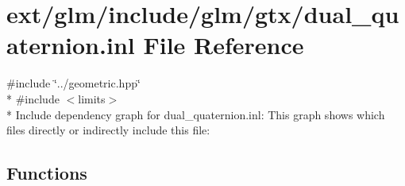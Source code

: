 \hypertarget{dual__quaternion_8inl}{\section{ext/glm/include/glm/gtx/dual\-\_\-quaternion.inl File Reference}
\label{dual__quaternion_8inl}
}
{\ttfamily \#include \char`\"{}../geometric.\-hpp\char`\"{}}\\*
{\ttfamily \#include $<$limits$>$}\\*
Include dependency graph for dual\-\_\-quaternion.\-inl\-:
This graph shows which files directly or indirectly include this file\-:
\subsection*{Functions}
